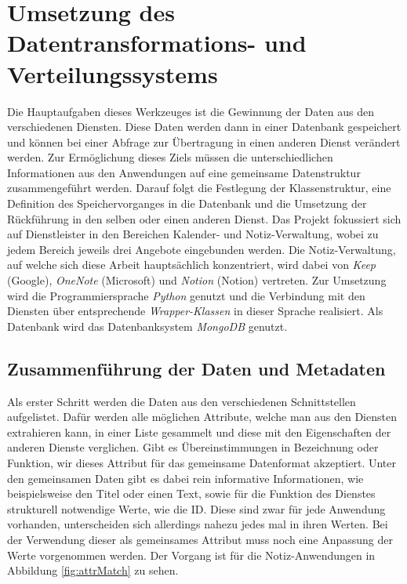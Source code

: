 \chapter{Umsetzung des Datentransformations- und Verteilungssystems}

Die Hauptaufgaben dieses Werkzeuges ist die Gewinnung der Daten aus den verschiedenen Diensten. Diese Daten werden dann in einer Datenbank gespeichert und können bei einer Abfrage zur Übertragung in einen anderen Dienst verändert werden. Zur Ermöglichung dieses Ziels müssen die unterschiedlichen Informationen aus den Anwendungen auf eine gemeinsame Datenstruktur zusammengeführt werden. Darauf folgt die Festlegung der Klassenstruktur, eine Definition des Speichervorganges in die Datenbank und die Umsetzung der Rückführung in den selben oder einen anderen Dienst. Das Projekt fokussiert sich auf Dienstleister in den Bereichen Kalender- und Notiz-Verwaltung, wobei zu jedem Bereich jeweils drei Angebote eingebunden werden. Die Notiz-Verwaltung, auf welche sich diese Arbeit hauptsächlich konzentriert, wird dabei von \textit{Keep} (Google), \textit{OneNote} (Microsoft) und \textit{Notion} (Notion) vertreten. Zur Umsetzung wird die Programmiersprache \textit{Python} genutzt und die Verbindung mit den Diensten über entsprechende \textit{Wrapper-Klassen} in dieser Sprache realisiert. Als Datenbank wird das Datenbanksystem \textit{MongoDB} genutzt. 

\section{Zusammenführung der Daten und Metadaten}

Als erster Schritt werden die Daten aus den verschiedenen Schnittstellen aufgelistet. Dafür werden alle möglichen Attribute, welche man aus den Diensten extrahieren kann, in einer Liste gesammelt und diese mit den Eigenschaften der anderen Dienste verglichen. Gibt es Übereinstimmungen in Bezeichnung oder Funktion, wir dieses Attribut für das gemeinsame Datenformat akzeptiert. Unter den gemeinsamen Daten gibt es dabei rein informative Informationen, wie beispielsweise den Titel oder einen Text, sowie für die Funktion des Dienstes strukturell notwendige Werte, wie die ID. Diese sind zwar für jede Anwendung vorhanden, unterscheiden sich allerdings nahezu jedes mal in ihren Werten. Bei der Verwendung dieser als gemeinsames Attribut muss noch eine Anpassung der Werte vorgenommen werden. Der Vorgang ist für die Notiz-Anwendungen in Abbildung \ref{fig:attrMatch} zu sehen.\\

